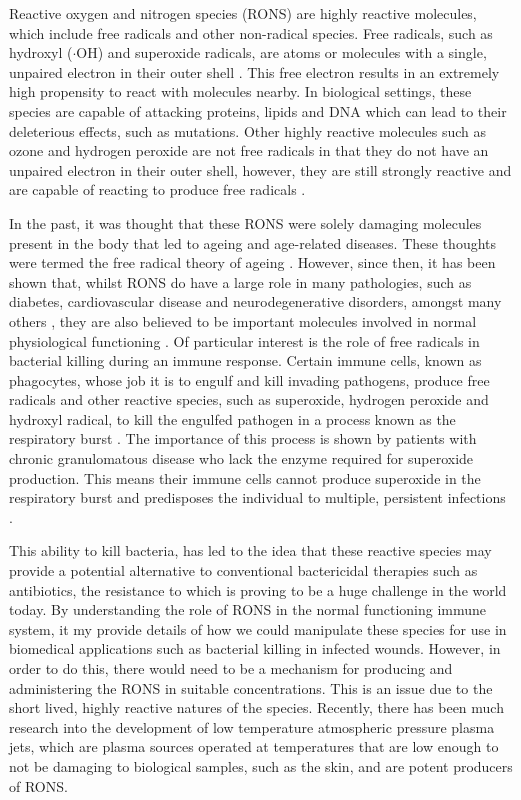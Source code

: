 \documentclass[11pt, oneside]{article}   	%
\begin{document}
Reactive oxygen and nitrogen species (RONS) are highly reactive molecules, which include free radicals and other non-radical species. 
Free radicals, such as hydroxyl ($\cdot$OH) and superoxide radicals, are atoms or molecules with a single, unpaired electron in their outer shell \cite{PhamHuy2008}. 
This free electron results in an extremely high propensity to react with molecules nearby. 
In biological settings, these species are capable of attacking proteins, lipids and DNA \cite{PhamHuy2008} which can lead to their deleterious effects, such as mutations.
Other highly reactive molecules such as ozone and hydrogen peroxide are not free radicals in that they do not have an unpaired electron in their outer shell, however, they are still strongly reactive and are capable of reacting to produce free radicals \cite{PhamHuy2008}.

In the past, it was thought that these RONS were solely damaging molecules present in the body that led to ageing and age-related diseases.
These thoughts were termed the free radical theory of ageing \cite{Harman1955}. 
However, since then, it has been shown that, whilst RONS do have a large role in many pathologies, such as diabetes, cardiovascular disease and neurodegenerative disorders, amongst many others \cite{Valko2007, Floyd1999}, they are also believed to be important molecules involved in normal physiological functioning \cite{Ma2014}.
Of particular interest is the role of free radicals in bacterial killing during an immune response.
Certain immune cells, known as phagocytes, whose job it is to engulf and kill invading pathogens, produce free radicals and other reactive species, such as superoxide, hydrogen peroxide and hydroxyl radical, to kill the engulfed pathogen in a process known as the respiratory burst \cite{Janeway2011}.
The importance of this process is shown by patients with chronic granulomatous disease who lack the enzyme required for superoxide production. This means their immune cells cannot produce superoxide in the respiratory burst and predisposes the individual to multiple, persistent infections \cite{Janeway2011, Babior2004}.


This ability to kill bacteria, has led to the idea that these reactive species may provide a potential alternative to conventional bactericidal therapies such as antibiotics, the resistance to which is proving to be a huge challenge in the world today. 
By understanding the role of RONS in the normal functioning immune system, it my provide details of how we could manipulate these species for use in biomedical applications such as bacterial killing in infected wounds.
However, in order to do this, there would need to be a mechanism for producing and administering the RONS in suitable concentrations.
This is an issue due to the short lived, highly reactive natures of the species.
Recently, there has been much research into the development of low temperature atmospheric pressure plasma jets, which are plasma sources operated at temperatures that are low enough to not be damaging to biological samples, such as the skin, and are potent producers of RONS. 
\end{document}
